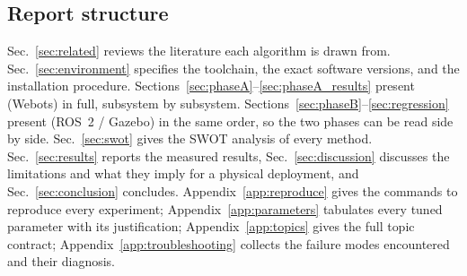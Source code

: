 

\subsection{Report structure}

Sec.~\ref{sec:related} reviews the literature each algorithm is drawn
from. Sec.~\ref{sec:environment} specifies the toolchain, the exact
software versions, and the installation procedure.
Sections~\ref{sec:phaseA}--\ref{sec:phaseA_results} present \phaseA{}
(Webots) in full, subsystem by subsystem.
Sections~\ref{sec:phaseB}--\ref{sec:regression} present \phaseB{}
(ROS~2 / Gazebo) in the same order, so the two phases can be read side
by side. Sec.~\ref{sec:swot} gives the SWOT analysis of every method.
Sec.~\ref{sec:results} reports the measured results,
Sec.~\ref{sec:discussion} discusses the limitations and what they imply
for a physical deployment, and Sec.~\ref{sec:conclusion} concludes.
Appendix~\ref{app:reproduce} gives the commands to reproduce every
experiment; Appendix~\ref{app:parameters} tabulates every tuned
parameter with its justification; Appendix~\ref{app:topics} gives the
full topic contract; Appendix~\ref{app:troubleshooting} collects the
failure modes encountered and their diagnosis.
